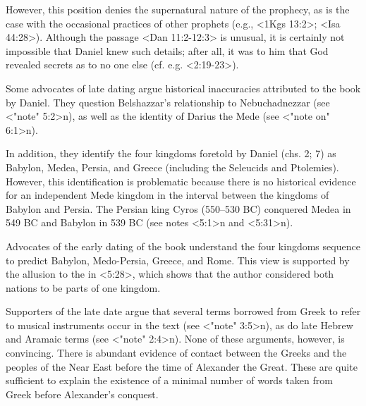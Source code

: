 However, this position denies the supernatural nature of the prophecy, as is the case with the occasional practices of other prophets (e.g., <1Kgs 13:2>; <Isa 44:28>). Although the passage <Dan 11:2-12:3> is unusual, it is certainly not impossible that Daniel knew such details; after all, it was to him that God revealed secrets as to no one else (cf. e.g. <2:19-23>).  



Some advocates of late dating argue historical inaccuracies attributed to the book by Daniel.
They question Belshazzar's relationship to Nebuchadnezzar %
(see <"note" 5:2>n), as well as the identity of Darius the Mede (see <"note on" 6:1>n). 

In addition, they identify the four kingdoms foretold by Daniel (chs. 2; 7) as Babylon, Medea, Persia, and Greece (including the Seleucids and Ptolemies). However, this identification is problematic because there is no historical evidence for an independent Mede kingdom in the interval between the kingdoms of Babylon and Persia.
The Persian king Cyros (550--530 BC) conquered Medea in 549 BC and Babylon in 539 BC (see notes <5:1>n and <5:31>n).

Advocates of the early dating of the book understand the four kingdoms sequence to predict Babylon, Medo-Persia, Greece, and Rome. 
This view is supported by the allusion to the  in <5:28>, which shows that the author considered both nations to be parts of one kingdom.






Supporters of the late date argue that several terms borrowed from Greek to refer to musical instruments occur in the text (see <"note" 3:5>n), as do late Hebrew and Aramaic terms (see <"note" 2:4>n).
None of these arguments, however, is convincing.
There is abundant evidence of contact between the Greeks and the peoples of the Near East before the time of Alexander the Great. These are quite sufficient to explain the existence of a minimal number of words taken from Greek before Alexander's conquest. 


